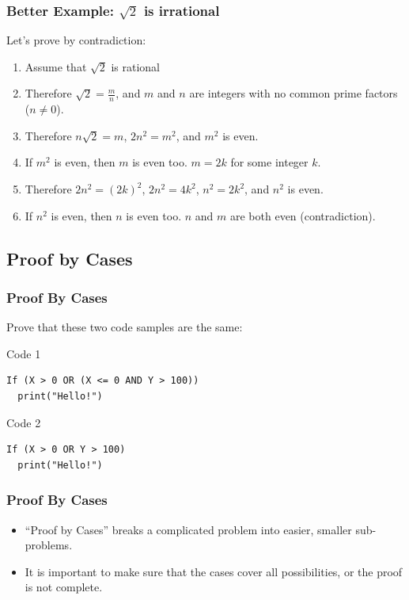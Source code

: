 \documentclass{beamer}
\begin{document}
\begin{frame}
  \frametitle{Better Example: $\sqrt{2}$ is irrational}
  
  Let's prove by contradiction:

  \bigskip
  
  \begin{enumerate}
  \item Assume that $\sqrt{2}$ is rational
    \bigskip
  \item Therefore $\sqrt{2} = \frac{m}{n}$, and $m$ and $n$ are
    integers with \alert{no common prime factors} ($n\neq0$).
    \bigskip
  \item Therefore $n\sqrt{2} = m$, $2n^2 = m^2$, and $m^2$ is even.
    \bigskip
  \item If $m^2$ is even, then $m$ is even too. $m = 2k$ for some integer $k$.
    \bigskip
  \item Therefore $2n^2 = (2k)^2$, $2n^2 = 4k^2$, $n^2 = 2k^2$, and $n^2$ is even.
    \bigskip
  \item If $n^2$ is even, then $n$ is even too. \alert{$n$ and $m$ are both even (contradiction).} 
  \end{enumerate}
  

  
\end{frame}

\subsection{Proof by Cases}

\begin{frame}[fragile]
  \frametitle{Proof By Cases}

  Prove that these two code samples are the same:

  \vfill
  
  \begin{block}{Code 1}
\begin{verbatim}
If (X > 0 OR (X <= 0 AND Y > 100))
  print("Hello!")
\end{verbatim}
  \end{block}
  \begin{block}{Code 2}
\begin{verbatim}
If (X > 0 OR Y > 100)
  print("Hello!") 
\end{verbatim}
  \end{block}
  
\end{frame}

\begin{frame}
  \frametitle{Proof By Cases}

  \begin{itemize}
  \item ``Proof by Cases'' breaks a complicated problem into easier, smaller sub-problems.

    \bigskip
    
  \item It is important to make sure that \alert{the cases cover all possibilities}, or the
    proof is not complete.
  \end{itemize}
\end{frame}
\end{document}
